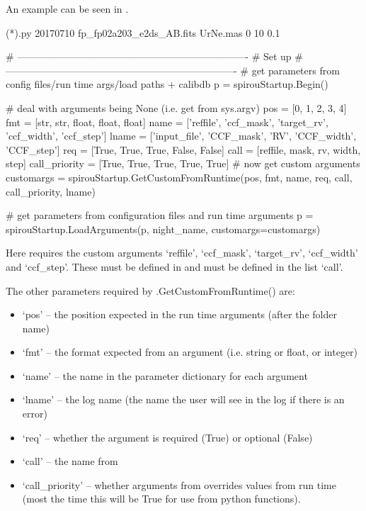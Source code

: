 \begin{minipage}{\textwidth}
An example can be seen in \calCCF.
\begin{cmdbox}
(*\calCCF*).py 20170710 fp_fp02a203_e2ds_AB.fits UrNe.mas 0 10 0.1
\end{cmdbox}
\begin{pythonbox}
    # ----------------------------------------------------------------------
    # Set up
    # ----------------------------------------------------------------------
    # get parameters from config files/run time args/load paths + calibdb
    p = spirouStartup.Begin()

    # deal with arguments being None (i.e. get from sys.argv)
    pos = [0, 1, 2, 3, 4]
    fmt = [str, str, float, float, float]
    name = ['reffile', 'ccf_mask', 'target_rv', 'ccf_width', 'ccf_step']
    lname = ['input_file', 'CCF_mask', 'RV', 'CCF_width', 'CCF_step']
    req = [True, True, True, False, False]
    call = [reffile, mask, rv, width, step]
    call_priority = [True, True, True, True, True]
    # now get custom arguments
    customargs = spirouStartup.GetCustomFromRuntime(pos, fmt, name, req, call,
                                                    call_priority, lname)
    
    # get parameters from configuration files and run time arguments
    p = spirouStartup.LoadArguments(p, night_name, customargs=customargs)
\end{pythonbox}
\begin{note}
Here \calCCF requires the custom arguments `reffile', `ccf\_mask', `target\_rv', `ccf\_width' and `ccf\_step'. These must be defined in \progMAIN and must be defined in the list `call'. 

The other parameters required by \spirouStartup.GetCustomFromRuntime() are:
\begin{itemize}
	\item `pos' -- the position expected in the run time arguments (after the folder name)
	\item `fmt' -- the format expected from an argument (i.e. string or float, or integer)
	\item `name' -- the name in the parameter dictionary for each argument
	\item `lname' -- the log name (the name the user will see in the log if there is an error)
	\item `req' -- whether the argument is required (True) or optional (False)
	\item `call' -- the name from \progMAIN
	\item `call\_priority' -- whether arguments from \progMAIN overrides values from run time (most the time this will be True for use from python functions).
\end{itemize}
\end{note}
\end{minipage}



